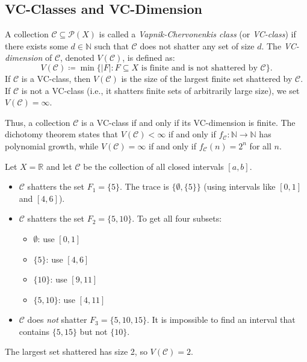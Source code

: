 \subsection{VC-Classes and VC-Dimension}

\begin{definition}\label{def:vc-class-dimension}
    A collection $\mathcal{C} \subseteq \mathcal{P}(X)$ is called a \emph{Vapnik-Chervonenkis class} (or \emph{VC-class}) if there exists some $d \in \mathbb{N}$ such that $\mathcal{C}$ does not shatter any set of size $d$. The \emph{VC-dimension} of $\mathcal{C}$, denoted $V(\mathcal{C})$, is defined as:
    \[
        V(\mathcal{C}) \coloneq \min \{|F| : F \subseteq X \text{ is finite and is not shattered by } \mathcal{C}\}.
    \]
    If $\mathcal{C}$ is a VC-class, then $V(\mathcal{C})$ is the size of the largest finite set shattered by $\mathcal{C}$. If $\mathcal{C}$ is not a VC-class (i.e., it shatters finite sets of arbitrarily large size), we set $V(\mathcal{C}) = \infty$.
\end{definition}

Thus, a collection $\mathcal{C}$ is a VC-class if and only if its VC-dimension is finite. The dichotomy theorem states that $V(\mathcal{C}) < \infty$ if and only if $f_{\mathcal{C}}:\mathbb{N} \to \mathbb{N}$ has polynomial growth, while $V(\mathcal{C}) = \infty$ if and only if $f_{\mathcal{C}}(n) = 2^n$ for all $n$.

\begin{example}[Intervals]
    Let $X = \mathbb{R}$ and let $\mathcal{C}$ be the collection of all closed intervals $[a, b]$.
    \begin{itemize}
        \item $\mathcal{C}$ shatters the set $F_1 = \{5\}$. The trace is $\{\emptyset, \{5\}\}$ (using intervals like $[0,1]$ and $[4,6]$).
        \item $\mathcal{C}$ shatters the set $F_2 = \{5, 10\}$. To get all four subsets:
        \begin{itemize}
            \item $\emptyset$: use $[0,1]$
            \item $\{5\}$: use $[4,6]$
            \item $\{10\}$: use $[9,11]$
            \item $\{5, 10\}$: use $[4,11]$
        \end{itemize}
        \item $\mathcal{C}$ does \emph{not} shatter $F_3 = \{5, 10, 15\}$. It is impossible to find an interval that contains $\{5, 15\}$ but not $\{10\}$.
    \end{itemize}
    The largest set shattered has size 2, so $V(\mathcal{C}) = 2$.
\end{example}

